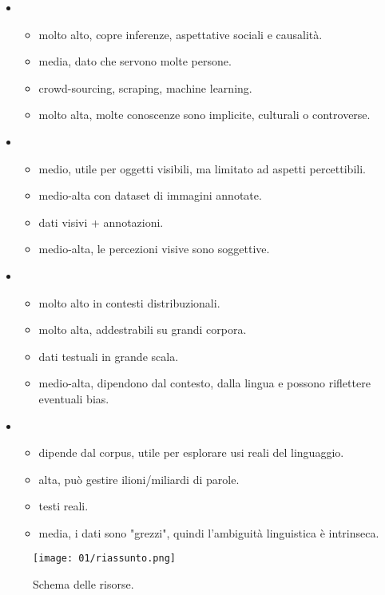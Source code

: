 \begin{itemize}
  \item {}
    \begin{itemize}
      \item {} molto alto, copre inferenze, aspettative sociali e causalità.
      \item {} media, dato che servono molte persone. 
      \item {} crowd-sourcing, scraping, machine learning.
      \item {} molto alta, molte conoscenze sono implicite, culturali o controverse.
    \end{itemize}
    \item {}
    \begin{itemize}
      \item {} medio, utile per oggetti visibili, ma limitato ad aspetti percettibili. 
      \item {}  medio-alta con dataset di immagini annotate.
      \item {} dati visivi + annotazioni.
      \item {} medio-alta, le percezioni visive sono soggettive.
    \end{itemize}
\item {}
    \begin{itemize}
      \item {} molto alto in contesti distribuzionali. 
      \item {} molto alta, addestrabili su grandi corpora.
      \item {} dati testuali in grande scala.
      \item {} medio-alta, dipendono dal contesto, dalla lingua e possono riflettere eventuali bias.
    \end{itemize}
\item {}
    \begin{itemize}
      \item {} dipende dal corpus, utile per esplorare usi reali del linguaggio. 
      \item {} alta, può gestire ilioni/miliardi di parole.
      \item {} testi reali.
      \item {} media, i dati sono "grezzi", quindi l'ambiguità linguistica è intrinseca.
    \end{itemize}

\end{itemize}

\begin{figure}[h]
    \centering
    \texttt{[image: 01/riassunto.png]}
    \caption{Schema delle risorse.}
\end{figure}


